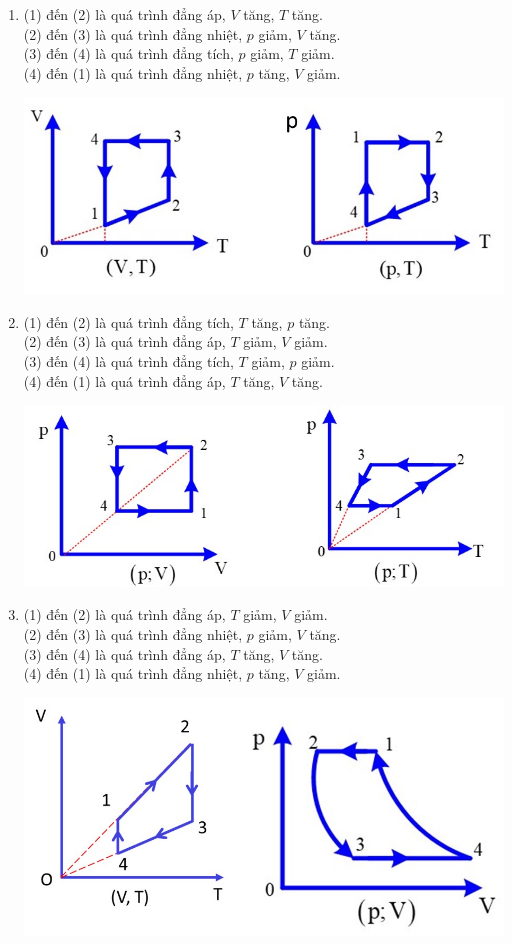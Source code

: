 \begin{ex}
{\begin{enumerate}[label=\alph*)]
\begin{center}
			\end{center}
			\item (1) đến (2) là quá trình đẳng áp, $V$ tăng, $T$ tăng.\\
			(2) đến (3) là quá trình đẳng nhiệt, $p$ giảm, $V$ tăng.\\
			(3) đến (4) là quá trình đẳng tích, $p$ giảm, $T$ giảm.\\
			(4) đến (1) là quá trình đẳng nhiệt, $p$ tăng, $V$ giảm.
			\begin{center}
				\includegraphics[width=0.65\linewidth]{figs/VN12-Y24-PH-SYL-014P-12}
			\end{center} 
			\item (1) đến (2) là quá trình đẳng tích, $T$ tăng, $p$ tăng.\\
			(2) đến (3) là quá trình đẳng áp, $T$ giảm, $V$ giảm.\\
			(3) đến (4) là quá trình đẳng tích, $T$ giảm, $p$ giảm.\\
			(4) đến (1) là quá trình đẳng áp, $T$ tăng, $V$ tăng.
			\begin{center}
				\includegraphics[width=0.65\linewidth]{figs/VN12-Y24-PH-SYL-014P-13}
			\end{center}
			\item (1) đến (2) là quá trình đẳng áp, $T$ giảm, $V$ giảm.\\
			(2) đến (3) là quá trình đẳng nhiệt, $p$ giảm, $V$ tăng.\\
			(3) đến (4) là quá trình đẳng áp, $T$ tăng, $V$ tăng.\\
			(4) đến (1) là quá trình đẳng nhiệt, $p$ tăng, $V$ giảm.
			\begin{center}
				\includegraphics[width=0.65\linewidth]{figs/VN12-Y24-PH-SYL-014P-14.jpg}
			\end{center}
		\end{enumerate}
	}
\end{ex}
